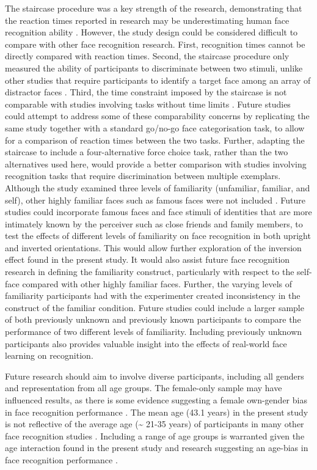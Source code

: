 \documentclass[
  authoryear,
  review,
  3p,
  onecolumn]{elsarticle}
\begin{document}
The staircase procedure was a key strength of the research,
demonstrating that the reaction times reported in research may be
underestimating human face recognition ability
\citep{besson2016a, caharel2014a, ramon2011a}. However, the study design
could be considered difficult to compare with other face recognition
research. First, recognition times cannot be directly compared with
reaction times. Second, the staircase procedure only measured the
ability of participants to discriminate between two stimuli, unlike
other studies that require participants to identify a target face among
an array of distractor faces \citep{megraya2006a}. Third, the time
constraint imposed by the staircase is not comparable with studies
involving tasks without time limits \citep{zimmermann2019a}. Future
studies could attempt to address some of these comparability concerns by
replicating the same study together with a standard go/no-go face
categorisation task, to allow for a comparison of reaction times between
the two tasks. Further, adapting the staircase to include a
four-alternative force choice task, rather than the two alternatives
used here, would provide a better comparison with studies involving
recognition tasks that require discrimination between multiple
exemplars. Although the study examined three levels of familiarity
(unfamiliar, familiar, and self), other highly familiar faces such as
famous faces were not included \citep{campbell2020a, wiese2021a}. Future
studies could incorporate famous faces and face stimuli of identities
that are more intimately known by the perceiver such as close friends
and family members, to test the effects of different levels of
familiarity on face recognition in both upright and inverted
orientations. This would allow further exploration of the inversion
effect found in the present study. It would also assist future face
recognition research in defining the familiarity construct, particularly
with respect to the self-face compared with other highly familiar faces.
Further, the varying levels of familiarity participants had with the
experimenter created inconsistency in the construct of the familiar
condition. Future studies could include a larger sample of both
previously unknown and previously known participants to compare the
performance of two different levels of familiarity. Including previously
unknown participants also provides valuable insight into the effects of
real-world face learning on recognition.

Future research should aim to involve diverse participants, including
all genders and representation from all age groups. The female-only
sample may have influenced results, as there is some evidence suggesting
a female own-gender bias in face recognition performance
\citep{herlitz2013a, lov2011a, mishra2019a}. The mean age (43.1 years)
in the present study is not reflective of the average age
(\textasciitilde{} 21-35 years) of participants in many other face
recognition studies
\citep{kloth2006a, mohr2018a, pachai2017a, platek2009a}. Including a
range of age groups is warranted given the age interaction found in the
present study and research suggesting an age-bias in face recognition
performance \citep{rhodes2012a}.
\end{document}
